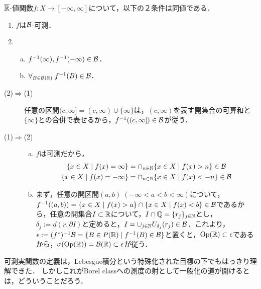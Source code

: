 \documentclass[uplatex, dvipdfmx]{jsreport}
\begin{document}
\begin{theorem}
    $\overline{\mathbb{R}}$-値関数$f:X\to[-\infty,\infty]$について，以下の２条件は同値である．
    \begin{enumerate}
        \item $f$は$\mathcal{B}$-可測．
        \item \begin{enumerate}[(a)]
            \item $f^{-1}(\infty),f^{-1}(-\infty)\in\mathcal{B}$．
            \item $\forall_{B\in\mathcal{B}(\mathbb{R})}\;f^{-1}(B)\in\mathcal{B}$．
        \end{enumerate}
    \end{enumerate}
\end{theorem}
\begin{Proof}\mbox{}
    \begin{description}
        \item[(2)$\Rightarrow$(1)] 任意の区間$(c,\infty]=(c,\infty)\cup\{\infty\}$は，$(c,\infty)$を表す開集合の可算和と$\{\infty\}$との合併で表せるから，$f^{-1}((c,\infty])\in\mathcal{B}$が従う．
        \item[(1)$\Rightarrow$(2)] 
        \begin{enumerate}[(a)]
            \item $f$は可測だから，\begin{align*}
                \{x\in X\mid f(x)=\infty\}&=\cap_{n\in\mathbb{N}}\{x\in X\mid f(x)>n\}\in\mathcal{B}\\
                \{x\in X\mid f(x)=-\infty\}&=\cap_{n\in\mathbb{N}}\{x\in X\mid f(x)<-n\}\in\mathcal{B}
            \end{align*}
            \item まず，任意の開区間$(a,b)\;(-\infty<a<b<\infty)$について，$f^{-1}((a,b))=\{x\in X\mid f(x)>a\}\cap\{x\in X\mid f(x)<b\}\in\mathcal{B}$であるから，任意の開集合$I\subset\mathbb{R}$について，$I\cap\mathbb{Q}=\{r_j\}_{j\in\mathbb{N}}$とし，$\delta_j:=d(r,\partial I)$と定めると，$I=\cup_{j\in\mathbb{N}}U_{\delta_j}(r_j)\in\mathcal{B}$．これより，$\epsilon:=(f^*)^{-1}\mathcal{B}=\{B\in P(\mathbb{R})\mid f^{-1}(B)\in\mathcal{B}\}$と置くと，$\mathrm{Op}(\mathbb{R})\subset\epsilon$であるから，$\sigma(\mathrm{Op}(\mathbb{R}))=\mathcal{B}(\mathbb{R})\subset\epsilon$が従う．
        \end{enumerate}
    \end{description}
\end{Proof}
\begin{remarks}
    可測実関数の定義は，Lebesgue積分という特殊化された目標の下でもはっきり理解できた．
    しかしこれがBorel classへの測度の射として一般化の道が開けるとは，どういうことだろう．
\end{remarks}
\end{document}
